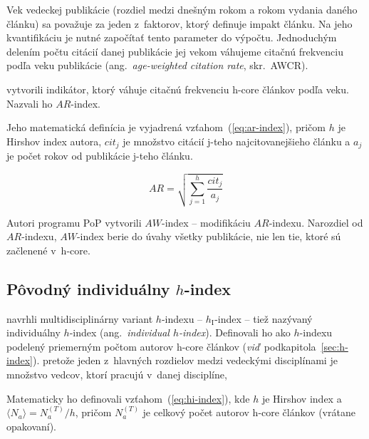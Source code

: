 Vek vedeckej publikácie (rozdiel medzi dnešným rokom a rokom vydania daného
článku) sa považuje za jeden z~faktorov, ktorý definuje impakt článku.  Na jeho
kvantifikáciu je nutné započítať tento parameter do výpočtu.  Jednoduchým
delením počtu citácií danej publikácie jej vekom váhujeme citačnú frekvenciu
podľa veku publikácie (ang.~\emph{age-weighted citation rate}, skr.~AWCR).

\citet{Jin2007} vytvorili indikátor, ktorý váhuje citačnú frekvenciu h-core
článkov podľa veku.  Nazvali ho $\mathit{AR}$-index.

Jeho matematická definícia je vyjadrená vzťahom~(\ref{eq:ar-index}), pričom $h$
je Hirshov index autora, $\mathit{cit}_j$ je množstvo citácií j-teho
najcitovanejšieho článku a $a_j$ je počet rokov od publikácie j-teho článku.

\begin{equation}
\label{eq:ar-index}
\mathit{AR} = \sqrt{\sum_{j=1}^h{\frac{\mathit{cit}_j}{a_j}}}
\end{equation}

Autori programu PoP 
vytvorili $\mathit{AW}$-index -- modifikáciu $\mathit{AR}$-indexu.  Narozdiel
od $\mathit{AR}$-indexu, $\mathit{AW}$-index berie do úvahy všetky publikácie,
nie len tie, ktoré sú začlenené v~h-core.


\subsection{Pôvodný individuálny $h$-index}
\label{sec:hi-index}

\citet{Batista2006} navrhli multidisciplinárny variant
$h$-indexu -- $h_{\mathrm{I}}$-index -- tiež nazývaný individuálny $h$-index
(ang.~\emph{individual $h$-index}).  Definovali ho ako $h$-indexu podelený
priemerným počtom autorov h-core článkov
(\emph{viď}~podkapitola~\ref{sec:h-index}).  pretože jeden z~hlavných rozdielov
medzi vedeckými disciplínami je množstvo vedcov, ktorí pracujú v~danej
disciplíne,


Matematicky ho definovali vzťahom~(\ref{eq:hi-index}), kde $h$ je Hirshov index
a $\langle N_a \rangle = N_a^{(T)} / h$, pričom $N_a^{(T)}$ je celkový počet
autorov h-core článkov (vrátane opakovaní).

